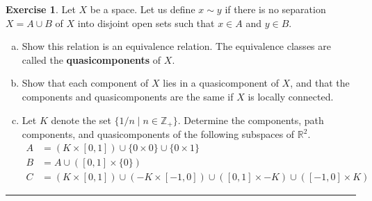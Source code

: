 \documentclass{article}
\theoremstyle{definition}
\newtheorem{exercise}{Exercise}[section]
\begin{document}
\pagebreak

\begin{exercise}
  Let $X$ be a space. Let us define $x\sim y$ if there is no separation $X = A\cup B$ of $X$ into disjoint open sets such that $x\in A$ and $y\in B$.
  \begin{enumerate}[(a)]
    \item Show this relation is an equivalence relation. The equivalence classes are called the \textbf{quasicomponents} of $X$.
    \item Show that each component of $X$ lies in a quasicomponent of $X$, and that the components and quasicomponents are the same if $X$ is locally connected.
    \item Let $K$ denote the set $\{1/n\mid n\in\mathbb{Z}_+\}$. Determine the components, path components, and quasicomponents of the following subspaces of $\mathbb{R}^2$.
    \begin{align*}
      A &= (K\times [0,1]) \cup \{0\times 0\}\cup \{0\times 1\} \\
      B &= A \cup ([0,1]\times \{0\}) \\
      C &= (K\times [0,1]) \cup (-K\times [-1,0]) \cup ([0,1]\times -K) \cup ([-1,0]\times K)
    \end{align*}
  \end{enumerate}
\end{exercise}
\hrule
\end{document}

